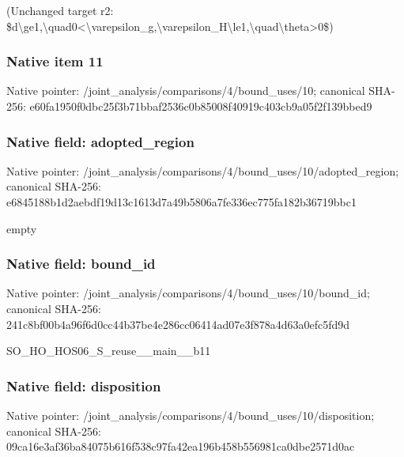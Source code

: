 \documentclass[10pt,a4paper]{article}
\begin{document}
\begingroup\raggedright\sloppy (Unchanged target r2:\allowbreak{} \$d\textbackslash{}ge1,\allowbreak{}\textbackslash{}quad0<\textbackslash{}varepsilon\_\allowbreak{}g,\allowbreak{}\textbackslash{}varepsilon\_\allowbreak{}H\textbackslash{}le1,\allowbreak{}\textbackslash{}quad\textbackslash{}theta>0\$)\par\endgroup

\subsubsection{Native item 11}
Native pointer: /joint\_\allowbreak{}analysis/comparisons/4/bound\_\allowbreak{}uses/10; canonical SHA-256: e60fa1950f0dbc25f3b71bbaf2536c0b85008f40919c403cb9a05f2f139bbed9

\subsubsection{Native field: adopted\_\allowbreak{}region}
Native pointer: /joint\_\allowbreak{}analysis/comparisons/4/bound\_\allowbreak{}uses/10/adopted\_\allowbreak{}region; canonical SHA-256: e6845188b1d2aebdf19d13c1613d7a49b5806a7fe336ec775fa182b36719bbc1

\begingroup\raggedright\sloppy empty\par\endgroup

\subsubsection{Native field: bound\_\allowbreak{}id}
Native pointer: /joint\_\allowbreak{}analysis/comparisons/4/bound\_\allowbreak{}uses/10/bound\_\allowbreak{}id; canonical SHA-256: 241c8bf00b4a96f6d0cc44b37be4e286cc06414ad07e3f878a4d63a0efc5fd9d

\begingroup\raggedright\sloppy SO\_\allowbreak{}HO\_\allowbreak{}HOS06\_\allowbreak{}S\_\allowbreak{}reuse\_\allowbreak{}\_\allowbreak{}main\_\allowbreak{}\_\allowbreak{}b11\par\endgroup

\subsubsection{Native field: disposition}
Native pointer: /joint\_\allowbreak{}analysis/comparisons/4/bound\_\allowbreak{}uses/10/disposition; canonical SHA-256: 09ca16e3af36ba84075b616f538c97fa42ea196b458b556981ca0dbe2571d0ac
\end{document}
